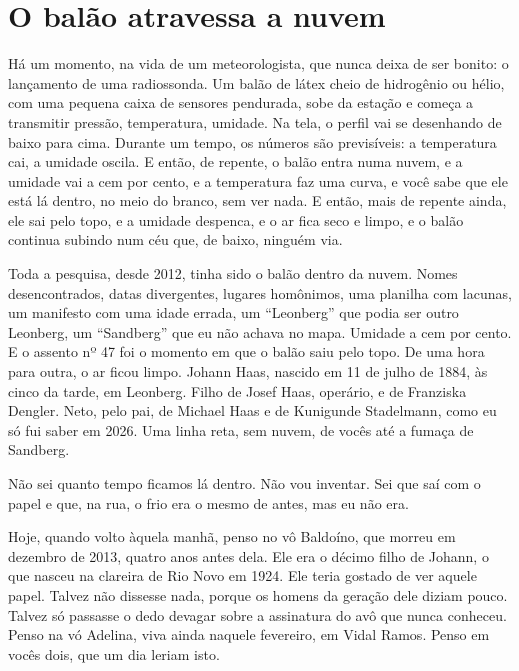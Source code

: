 \documentclass[
  brazilian,
  11pt,
  openany]{book}
\begin{document}
\section{O balão atravessa a nuvem}\label{o-baluxe3o-atravessa-a-nuvem}

Há um momento, na vida de um meteorologista, que nunca deixa de ser
bonito: o lançamento de uma radiossonda. Um balão de látex cheio de
hidrogênio ou hélio, com uma pequena caixa de sensores pendurada, sobe
da estação e começa a transmitir pressão, temperatura, umidade. Na tela,
o perfil vai se desenhando de baixo para cima. Durante um tempo, os
números são previsíveis: a temperatura cai, a umidade oscila. E então,
de repente, o balão entra numa nuvem, e a umidade vai a cem por cento, e
a temperatura faz uma curva, e você sabe que ele está lá dentro, no meio
do branco, sem ver nada. E então, mais de repente ainda, ele sai pelo
topo, e a umidade despenca, e o ar fica seco e limpo, e o balão continua
subindo num céu que, de baixo, ninguém via.

Toda a pesquisa, desde 2012, tinha sido o balão dentro da nuvem. Nomes
desencontrados, datas divergentes, lugares homônimos, uma planilha com
lacunas, um manifesto com uma idade errada, um ``Leonberg'' que podia
ser outro Leonberg, um ``Sandberg'' que eu não achava no mapa. Umidade a
cem por cento. E o assento nº 47 foi o momento em que o balão saiu pelo
topo. De uma hora para outra, o ar ficou limpo. Johann Haas, nascido em
11 de julho de 1884, às cinco da tarde, em Leonberg. Filho de Josef
Haas, operário, e de Franziska Dengler. Neto, pelo pai, de Michael Haas
e de Kunigunde Stadelmann, como eu só fui saber em 2026. Uma linha reta,
sem nuvem, de vocês até a fumaça de Sandberg.

Não sei quanto tempo ficamos lá dentro. Não vou inventar. Sei que saí
com o papel e que, na rua, o frio era o mesmo de antes, mas eu não era.

Hoje, quando volto àquela manhã, penso no vô Baldoíno, que morreu em
dezembro de 2013, quatro anos antes dela. Ele era o décimo filho de
Johann, o que nasceu na clareira de Rio Novo em 1924. Ele teria gostado
de ver aquele papel. Talvez não dissesse nada, porque os homens da
geração dele diziam pouco. Talvez só passasse o dedo devagar sobre a
assinatura do avô que nunca conheceu. Penso na vó Adelina, viva ainda
naquele fevereiro, em Vidal Ramos. Penso em vocês dois, que um dia
leriam isto.
\end{document}
